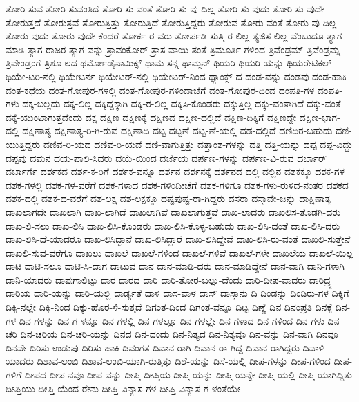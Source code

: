 {ತೋರಿ-ಸುವ
ತೋರಿ-ಸುವಂತಿದೆ
ತೋರಿ-ಸು-ವಂತೆ
ತೋರಿ-ಸು-ವು-ದಿಲ್ಲ
ತೋರಿ-ಸು-ವುದು
ತೋರಿ-ಸು-ವುದೇ
ತೋರುತ್ತದೆ
ತೋರುತ್ತವೆ
ತೋರುತ್ತಿತ್ತು
ತೋರುತ್ತಿದೆ
ತೋರುತ್ತಿದ್ದರು
ತೋರುವ
ತೋರು-ವಂತೆ
ತೋರು-ವು-ದಿಲ್ಲ
ತೋರು-ವುದು
ತೋರು-ವುದೇ-ಕೆಂದರೆ
ತೋರ್ಕ-ರ-ವರು
ತೋರ್ಪಡಿ-ಸುತ್ತಿ-ರ-ಲಿಲ್ಲ
ತ್ಯಜಿಸ-ಲಿಲ್ಲ-ವೆಂಬುದೂ
ತ್ಯಾಗ-ಮಾಡಿ
ತ್ಯಾಗ-ರಾಜರ
ತ್ಯಾಗ-ವನ್ನು
ತ್ರಾವಂಕೋರ್
ತ್ರಾಸ-ವಾಯಿ-ತಂತೆ
ತ್ರಿಮೂರ್ತಿ-ಗಳಿಂದ
ತ್ರಿವೆಂಡ್ರಮ್
ತ್ರಿವೆಂಡ್ರಮ್ನ
ತ್ರಿವೇಂಡ್ರಂಗೆ
ತ್ರಿಶೂ-ಲದ
ಥರ್ಮೋಡೈನಾಮಿಕ್ಸ್
ಥಾಮ-ಸನ್ನ
ಥಾಮ್ಸನ್
ಥಿಯರಿ
ಥಿಯರಿ-ಯನ್ನು
ಥಿಯರೇಟಿಕಲ್
ಥಿಯೇ-ಟರಿ-ನಲ್ಲಿ
ಥಿಯೇಟರ್ನ
ಥಿಯೇಟರ್-ನಲ್ಲಿ
ಥಿಯೇಟರ್-ನಿಂದ
ಥ್ಯಾಂಕ್ಸ್
ದ
ದಂಡ-ವನ್ನು
ದಂಡವು
ದಂಡ-ಹಾಕಿ
ದಂತ-ಕಥೆಯ
ದಂತ-ಗೋಪುರ-ಗಳಲ್ಲಿ
ದಂತ-ಗೋಪುರ-ಗಳಿಂದಾಚೆಗೆ
ದಂತ-ಗೋಪುರ-ದಿಂದ
ದಂಪತಿ-ಗಳ
ದಂಪತಿ-ಗಳು
ದಕ್ಕ-ಬಲ್ಲದು
ದಕ್ಕ-ಲಿಲ್ಲ
ದಕ್ಕಿದ್ದಕ್ಕಾಗಿ
ದಕ್ಕಿ-ರ-ಲಿಲ್ಲ
ದಕ್ಕಿಸಿ-ಕೊಂಡರು
ದಕ್ಕುತ್ತಿಲ್ಲ
ದಕ್ಕು-ವಂತಾಗಿದೆ
ದಕ್ಕು-ವಂತೆ
ದಕ್ಕೆ-ಯುಂಟಾಗುತ್ತದೆಂದು
ದಕ್ಷ
ದಕ್ಷಿಣ
ದಕ್ಷಿಣಕ್ಕೆ
ದಕ್ಷಿಣದ
ದಕ್ಷಿಣ-ದಲ್ಲಿದೆ
ದಕ್ಷಿಣ-ದಿಕ್ಕಿಗೆ
ದಕ್ಷಿಣದ್ದೇ
ದಕ್ಷಿಣ-ಭಾಗ-ದಲ್ಲಿ
ದಕ್ಷಿಣಾತ್ಯ
ದಕ್ಷಿಣಾತ್ಯ-ರಿ-ಗಿ-ರುವ
ದಕ್ಷಿಣಾದಿ
ದಟ್ಟ
ದಟ್ಟಣೆ
ದಟ್ಟ-ಣೆ-ಯಲ್ಲಿ
ದಡ-ದಲ್ಲಿದೆ
ದಣಿದಿರ-ಬಹುದು
ದಣಿ-ಯುತ್ತಿದ್ದರು
ದಣಿವ-ರಿ-ಯದ
ದಣಿವ-ರಿ-ಯದೆ
ದಣಿ-ವಾಗುತ್ತಿತ್ತು
ದತ್ತಾಂಶ-ಗಳನ್ನು
ದತ್ತಿ
ದತ್ತಿ-ಯನ್ನು
ದಪ್ಪ
ದಪ್ಪ-ವಿದ್ದು
ದಪ್ಪವು
ದಮನ
ದಯ-ಪಾಲಿ-ಸಿದರು
ದಯೆ-ಯಿಂದ
ದರ್ಜೆಯ
ದರ್ಪಣ-ಗಳನ್ನು
ದರ್ಪಣ-ವಿ-ರುವ
ದರ್ಬಾರ್
ದರ್ಬಾರ್ಗೆ
ದರ್ಶಕದ
ದರ್ಶ-ಕ-ರಿಗೆ
ದರ್ಶಕ-ವನ್ನೂ
ದರ್ಶನ
ದರ್ಶನಕ್ಕೆ
ದರ್ಶನದ
ದಲ್ಲಿ
ದಲ್ಲಿನ
ದಶಕಕ್ಕೂ
ದಶಕ-ಗಳ
ದಶಕ-ಗಳಲ್ಲಿ
ದಶಕ-ಗಳ-ವರೆಗೆ
ದಶಕ-ಗಳಾದ
ದಶಕ-ಗಳಿಂದೀಚೆಗೆ
ದಶಕ-ಗಳಿಗೂ
ದಶಕ-ಗಳು-ರುಳಿದ-ನಂತರ
ದಶಕದ
ದಶಕ-ದಲ್ಲಿ
ದಶಕ-ದ-ವರೆಗೆ
ದಶ-ಲಕ್ಷ
ದಶ-ಲಕ್ಷಕ್ಕೂ
ದಷ್ಟಪುಷ್ಟ-ರಾ-ಗಿದ್ದರು
ದಸರಾ
ದಸ್ತಾವೇ-ಜನ್ನು
ದಾಕ್ಷಿಣಾತ್ಯ
ದಾಖಲಾಗದೇ
ದಾಖಲಾಗಿ
ದಾಖ-ಲಾಗಿದೆ
ದಾಖಲಾಗಿವೆ
ದಾಖಲಾಗುತ್ತವೆ
ದಾಖ-ಲಾದರು
ದಾಖಲಿಸ-ತೊಡಗಿ-ದರು
ದಾಖ-ಲಿ-ಸಲು
ದಾಖ-ಲಿಸಿ
ದಾಖ-ಲಿಸಿ-ಕೊಂಡರು
ದಾಖ-ಲಿಸಿ-ಕೊಳ್ಳ-ಬಹುದು
ದಾಖ-ಲಿಸಿ-ದಂತೆ
ದಾಖ-ಲಿಸಿ-ದರು
ದಾಖ-ಲಿಸಿ-ದೆ-ಯಾದರೂ
ದಾಖ-ಲಿಸಿದ್ದಾನೆ
ದಾಖ-ಲಿಸಿದ್ದಾರೆ
ದಾಖ-ಲಿಸಿದ್ದೇವೆ
ದಾಖ-ಲಿಸಿ-ರು-ವಂತೆ
ದಾಖಲಿ-ಸುತ್ತೇನೆ
ದಾಖಲಿ-ಸುವ-ವರೆಗೂ
ದಾಖಲು
ದಾಖಲೆ
ದಾಖಲೆ-ಗಳಿಂದ
ದಾಖಲೆ-ಗಳಿವೆ
ದಾಖಲೆ-ಗಳೇ
ದಾಖಲೆಯ
ದಾಖಲೆ-ಯಿಲ್ಲ
ದಾಟಿ
ದಾಟಿ-ಸಲೂ
ದಾಟಿ-ಸಿ-ದಾಗ
ದಾಟುವ
ದಾನ
ದಾನ-ಮಾಡಿ-ದರು
ದಾನ-ಮಾಡಿದ್ದೇನೆ
ದಾನ-ವಾಗಿ
ದಾನಿ-ಗಳಾಗಿ
ದಾನಿ-ಯಾದರು
ದಾಪುಗಾಲಿಟ್ಟು
ದಾರ
ದಾರದ
ದಾರಿ
ದಾರಿ-ತೋರ-ಬಲ್ಲು-ದೆಂದು
ದಾರಿ-ದೀಪ-ವಾದರು
ದಾರಿದ್ರ್ಯ
ದಾರಿಯ
ದಾರಿ-ಯನ್ನು
ದಾರಿ-ಯಲ್ಲಿ
ದಾರ್ಡ್ಯತೆ
ದಾಳಿ
ದಾಸ-ವಾಳ
ದಾಸ್
ದಾಸ್ತಾನು
ದಿ
ದಿಂಡನ್ನು
ದಿಂಡಿರು-ಗಳ
ದಿಕ್ಕಿಗೆ
ದಿಕ್ಕಿ-ನಲ್ಲೇ
ದಿಕ್ಕಿ-ನಿಂದ
ದಿಕ್ಕು-ಹೊರ-ಳಿ-ಸುತ್ತದೆ
ದಿಗಂತ-ದಿಂದ
ದಿಗಂತ-ವನ್ನೂ
ದಿಟ್ಟ
ದಿಣ್ಣೆ
ದಿನ
ದಿನಂಪ್ರತಿ
ದಿನಕ್ಕೆ
ದಿನ-ಗಳ
ದಿನ-ಗಳನ್ನು
ದಿನ-ಗ-ಳನ್ನೂ
ದಿನ-ಗಳಲ್ಲಿ
ದಿನ-ಗಳಲ್ಲೂ
ದಿನ-ಗಳಲ್ಲೇ
ದಿನ-ಗಳಾದ
ದಿನ-ಗಳಿಂದ
ದಿನ-ಗಳು
ದಿನ-ಚರಿ
ದಿನ-ಚರಿಯ
ದಿನ-ಚರಿ-ಯನ್ನು
ದಿನದ
ದಿನ-ದಂದು
ದಿನ-ನಿತ್ಯದ
ದಿನ-ನಿತ್ಯವೂ
ದಿನ-ವನ್ನು
ದಿನ-ವಾಗಿ
ದಿನವೂ
ದಿನವೇ
ದಿರಿಸು-ಉಡುಪು
ದಿರಿಸು-ಹಾಕಿ
ದಿವಂಗತ
ದಿವಾನ-ರಾಗಿ
ದಿವಾನ-ರಾ-ಗಿದ್ದ
ದಿವಾನ-ರಾಗಿದ್ದರು
ದಿವಾಳಿ-ಯಾದರು
ದಿಶಾವ-ಲಂಬಿ
ದಿಶಾವ-ಲಂಬಿ-ಯಾಗಿ-ರುತ್ತಿತ್ತು
ದಿಶೆ-ಯನ್ನು
ದಿಸೆ-ಯಲ್ಲಿ
ದೀಪ-ಗಳನ್ನು
ದೀಪ-ಗಳಿಂದ
ದೀಪ-ಗಳಿಗೆ
ದೀಪದ
ದೀಪ-ನವೂ
ದೀಪ-ವನ್ನು
ದೀಪ್ತಿ
ದೀಪ್ತಿಯ
ದೀಪ್ತಿ-ಯನ್ನು
ದೀಪ್ತಿ-ಯನ್ನೇ
ದೀಪ್ತಿ-ಯಲ್ಲಿ
ದೀಪ್ತಿ-ಯಾಗಿದ್ದಿತು
ದೀಪ್ತಿಯು
ದೀಪ್ತಿ-ಯೆಂದ-ರೇನು
ದೀಪ್ತಿ-ವಿನ್ಯಾಸ-ಗಳ
ದೀಪ್ತಿ-ವಿನ್ಯಾಸ-ಗ-ಳಂತೆಯೇ
}
